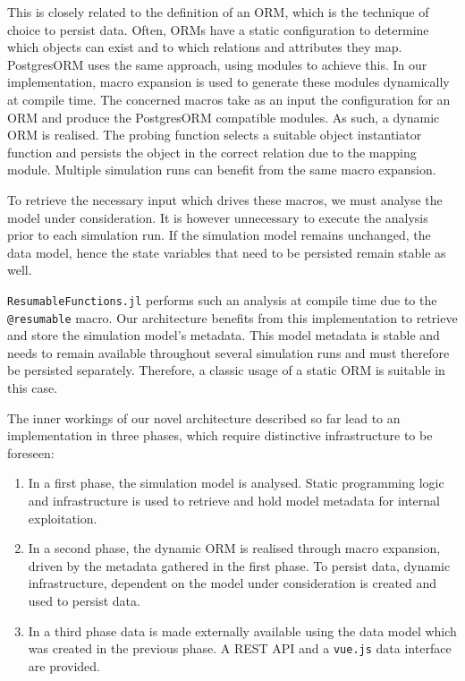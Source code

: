 \documentclass{juliacon}
\begin{document}
This is closely related to the definition of an ORM, which is the technique of choice to persist data. Often, ORMs have a static configuration to determine which objects can exist and to which relations and attributes they map. PostgresORM \cite{tecnivelPostgresORM} uses the same approach, using modules to achieve this. In our implementation, macro expansion is used to generate these modules dynamically at compile time. The concerned macros take as an input the configuration for an ORM and produce the PostgresORM compatible modules. As such, a dynamic ORM is realised. The probing function selects a suitable object instantiator function and persists the object in the correct relation due to the mapping module. Multiple simulation runs can benefit from the same macro expansion.\vskip 6pt

To retrieve the necessary input which drives these macros, we must analyse the model under consideration. It is however unnecessary to execute the analysis prior to each simulation run. If the simulation model remains unchanged, the data model, hence the state variables that need to be persisted remain stable as well.\vskip 6pt

\texttt{ResumableFunctions.jl} performs such an analysis at compile time due to the \texttt{@resumable} macro. Our architecture benefits from this implementation to retrieve and store the simulation model's metadata. This model metadata is stable and needs to remain available throughout several simulation runs and must therefore be persisted separately. Therefore, a classic usage of a static ORM is suitable in this case.\vskip 6pt

The inner workings of our novel architecture described so far lead to an implementation in three phases, which require distinctive infrastructure to be foreseen:

\begin{enumerate}
	\item In a first phase, the simulation model is analysed. Static programming logic and infrastructure is used to retrieve and hold model metadata for internal exploitation.
	\item In a second phase, the dynamic ORM is realised through macro expansion, driven by the metadata gathered in the first phase. To persist data, dynamic infrastructure, dependent on the model under consideration is created and used to persist data.
	\item In a third phase data is made externally available using the data model which was created in the previous phase. A REST API and a \texttt{vue.js} data interface are provided.
\end{enumerate}
\end{document}
